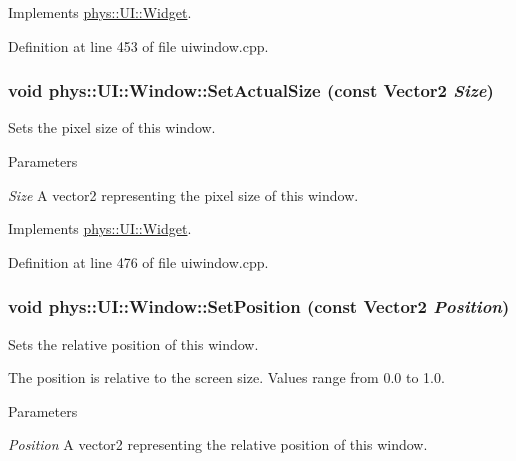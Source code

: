 Implements \hyperlink{classphys_1_1UI_1_1Widget_acba334c000c21f477238e961cd3ab2ce}{phys::UI::Widget}.



Definition at line 453 of file uiwindow.cpp.

\hypertarget{classphys_1_1UI_1_1Window_a1b9832e05d8c15a30a2ac12cc1ebb255}{
\subsubsection[{SetActualSize}]{\setlength{\rightskip}{0pt plus 5cm}void phys::UI::Window::SetActualSize (const {\bf Vector2} {\em Size})}}
\label{d4/d86/classphys_1_1UI_1_1Window_a1b9832e05d8c15a30a2ac12cc1ebb255}


Sets the pixel size of this window. 


\begin{DoxyParams}{Parameters}
\item[{\em Size}]A vector2 representing the pixel size of this window. \end{DoxyParams}


Implements \hyperlink{classphys_1_1UI_1_1Widget_a8c942355474d0b250dfadd4dac4ae400}{phys::UI::Widget}.



Definition at line 476 of file uiwindow.cpp.

\hypertarget{classphys_1_1UI_1_1Window_a66babe97151763b445e8920c5c231985}{
\subsubsection[{SetPosition}]{\setlength{\rightskip}{0pt plus 5cm}void phys::UI::Window::SetPosition (const {\bf Vector2} {\em Position})}}
\label{d4/d86/classphys_1_1UI_1_1Window_a66babe97151763b445e8920c5c231985}


Sets the relative position of this window. 

The position is relative to the screen size. Values range from 0.0 to 1.0. 
\begin{DoxyParams}{Parameters}
\item[{\em Position}]A vector2 representing the relative position of this window. \end{DoxyParams}


